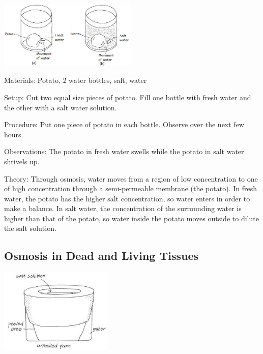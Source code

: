 \begin{multicols}{2}
\begin{center}
\includegraphics[width=0.49\textwidth]{./img/vso/osmosis-potato-full.jpg}
\end{center}

\begin{description*}
\item[Materials:]{Potato, 2 water bottles, salt, water}
\item[Setup:]{Cut two equal size pieces of potato. Fill one bottle with fresh water and the other with a salt water solution.}
\item[Procedure:]{Put one piece of potato in each bottle. Observe over the next few hours.}
\item[Observations:]{The potato in fresh water swells while the potato in salt water shrivels up.}
\item[Theory:]{Through osmosis, water moves from a region of low concentration to one of high concentration through a semi-permeable membrane (the potato). In fresh water, the potato has the higher salt concentration, so water enters in order to make a balance. In salt water, the concentration of the surrounding water is higher than that of the potato, so water inside the potato moves outside to dilute the salt solution.}
\end{description*}

\subsection{Osmosis in Dead and Living Tissues}

\begin{center}
\includegraphics[width=0.4\textwidth]{./img/vso/osmosis-dead-living.jpg}
\end{center}


\end{multicols}
